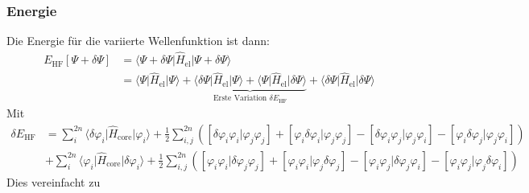 \subsubsection*{Energie}
Die Energie für die variierte Wellenfunktion ist dann:
\begin{equation}
\begin{aligned}
  E_\textrm{HF}[\Psi + \delta \Psi]
  &= \langle \Psi + \delta \Psi \vert \hat{H}_{\text{el}} \vert \Psi + \delta \Psi \rangle\\
  &= \langle \Psi \vert \hat{H}_{\text{el}} \vert \Psi \rangle +
  \underbrace{\langle \delta \Psi \vert \hat{H}_{\text{el}} \vert \Psi \rangle +
  \langle \Psi \vert \hat{H}_{\text{el}} \vert \delta \Psi \rangle}_\textrm{Erste Variation $\delta E_\textrm{HF}$} +
  \langle \delta \Psi \vert \hat{H}_{\text{el}} \vert \delta \Psi \rangle
\end{aligned}
\end{equation}
Mit
\begin{equation}
  \begin{split}
  \delta E_\textrm{HF} &= 
  \sum_i^{2n} \langle \delta \varphi_i \vert \hat{H}_{\text{core}} \vert \varphi_i \rangle
  + \frac{1}{2} \sum_{i, j}^{2n} \left( 
    \left[ \delta \varphi_i \varphi_i \vert \varphi_j \varphi_j \right]
  + \left[ \varphi_i \delta \varphi_i \vert \varphi_j \varphi_j \right]
  - \left[ \delta \varphi_i \varphi_j \vert \varphi_j \varphi_i \right]
  - \left[ \varphi_i \delta \varphi_j \vert \varphi_j \varphi_i \right]
  \right)\\
  &+ \sum_i^{2n} \langle \varphi_i \vert \hat{H}_{\text{core}} \vert \delta \varphi_i \rangle
  + \frac{1}{2} \sum_{i, j}^{2n} \left( 
    \left[ \varphi_i \varphi_i \vert \delta \varphi_j \varphi_j \right] 
  + \left[ \varphi_i \varphi_i \vert \varphi_j \delta \varphi_j \right]
  - \left[ \varphi_i \varphi_j \vert \delta \varphi_j \varphi_i \right]
  - \left[ \varphi_i \varphi_j \vert \varphi_j \delta \varphi_i \right]
  \right)
  \end{split}
\end{equation}
Dies vereinfacht zu
